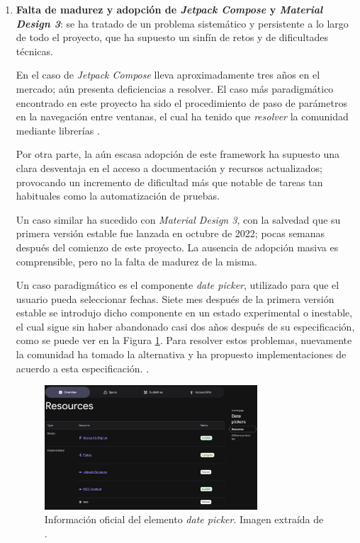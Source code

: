 \begin{enumerate}
        \item \textbf{Falta de madurez y adopción de \textit{Jetpack Compose} y \textit{Material Design 3}}: se ha tratado de un problema sistemático y persistente a lo largo de todo el proyecto, que ha supuesto un sinfín de retos y de dificultades técnicas.
    
        En el caso de \textit{Jetpack Compose} lleva aproximadamente tres años en el mercado; aún presenta deficiencias a resolver. El caso más paradigmático encontrado en este proyecto ha sido el procedimiento de paso de parámetros en la navegación entre ventanas, el cual ha tenido que \textit{resolver} la comunidad mediante librerías \cite{costa_overview_nodate}.  
        
        Por otra parte, la aún escasa adopción de este \gls{framework} ha supuesto una clara desventaja en el acceso a documentación y recursos actualizados; provocando un incremento de dificultad más que notable de tareas tan habituales como la automatización de pruebas.
    
        Un caso similar ha sucedido con \textit{Material Design 3}, con la salvedad que su primera versión estable fue lanzada en octubre de 2022; pocas semanas después del comienzo de este proyecto. La ausencia de adopción masiva es comprensible, pero no la falta de madurez de la misma. 
        
        Un caso paradigmático es el componente \textit{date picker}, utilizado para que el usuario pueda seleccionar fechas. Siete mes después de la primera versión estable se introdujo dicho componente en un estado experimental o inestable, el cual sigue sin haber abandonado casi dos años después de su especificación, como se puede ver en la Figura \ref{figure:problemas:date_picker}. Para resolver estos problemas, nuevamente la comunidad ha tomado la alternativa y ha propuesto implementaciones de acuerdo a esta especificación. \cite{keppeler_sheets-compose-dialogs_nodate}.
    
        \begin{figure}[h]
            \centering
            \includegraphics[width=0.75\textwidth]{figures/date_picker_status.JPG}
            \caption[Información oficial del elemento \textit{date picker}]
            {Información oficial del elemento \textit{date picker}. Imagen extraída de \cite{material_design_3_date_nodate}.}
            \label{figure:problemas:date_picker}
        \end{figure}
    

\end{enumerate}
